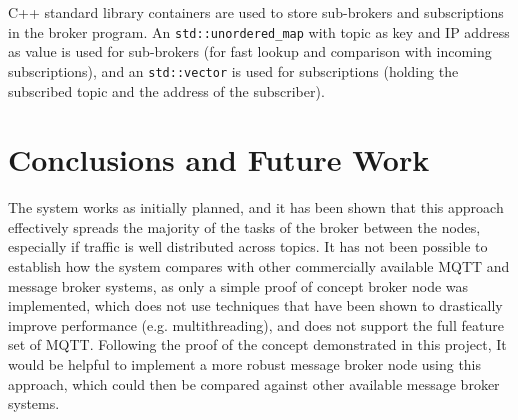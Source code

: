\documentclass[conference, a4paper]{IEEEtran}
\begin{document}
        C++ standard library containers are used to store sub-brokers and subscriptions in the broker program.
        An \texttt{std::unordered\_map} with topic as key and IP address as value is used for sub-brokers (for fast lookup and comparison with incoming subscriptions), and an \texttt{std::vector} is used for subscriptions (holding the subscribed topic and the address of the subscriber).

    \section{Conclusions and Future Work}
        The system works as initially planned, and it has been shown that this approach effectively spreads the majority of the tasks of the broker between the nodes, especially if traffic is well distributed across topics.
        It has not been possible to establish how the system compares with other commercially available MQTT and message broker systems, as only a simple proof of concept broker node was implemented, which does not use techniques that have been shown to drastically improve performance (e.g. multithreading), and does not support the full feature set of MQTT.
        Following the proof of the concept demonstrated in this project, It would be helpful to implement a more robust message broker node using this approach, which could then be compared against other available message broker systems.


    \printbibliography
\end{document}
